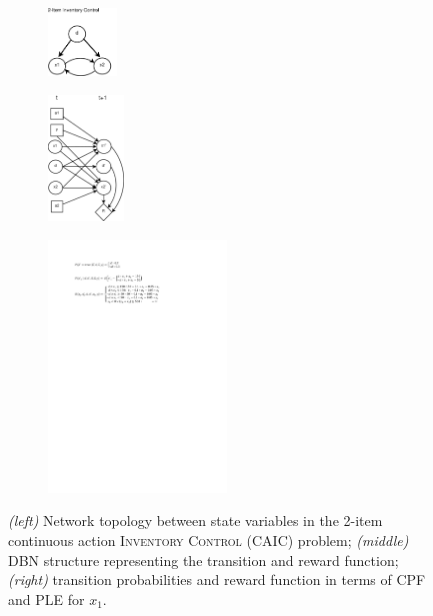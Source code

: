 \documentclass[twoside,11pt]{article}
\newcommand{\InventoryControl}{\textsc{Inventory Control }}
\begin{document}
\begin{figure}[t!]
 \begin{subfigure}
                \centering
                \includegraphics[width=0.2\textwidth]{pics/dbn_state.pdf}
        \end{subfigure}
                \hspace{2mm}
\begin{subfigure}
                \centering
                \includegraphics[width=0.22\textwidth]{pics/dbn_inv2.pdf}
        \end{subfigure}
                        \hspace{-1mm}
\begin{subfigure}
                \centering
                \includegraphics[width=0.52\textwidth]{pics/probabilities_2.pdf}
        \end{subfigure}
\caption{%
{\it (left)} Network topology between state variables in the 2-item continuous action \InventoryControl (CAIC) problem; {\it (middle)} DBN structure representing the transition and reward function; {\it (right)} transition probabilities and reward function in terms of CPF and PLE for $x_1$. }
\label{fig:dbn}
\end{figure}
\end{document}
